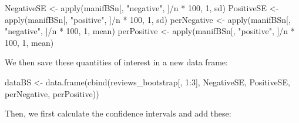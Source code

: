 \documentclass[
]{book}
\newenvironment{Shaded}{\begin{snugshade}}{\end{snugshade}}
\newcommand{\DecValTok}[1]{\textcolor[rgb]{0.00,0.00,0.81}{#1}}
\newcommand{\FloatTok}[1]{\textcolor[rgb]{0.00,0.00,0.81}{#1}}
\newcommand{\FunctionTok}[1]{\textcolor[rgb]{0.00,0.00,0.00}{#1}}
\newcommand{\NormalTok}[1]{#1}
\newcommand{\OtherTok}[1]{\textcolor[rgb]{0.56,0.35,0.01}{#1}}
\newcommand{\SpecialCharTok}[1]{\textcolor[rgb]{0.00,0.00,0.00}{#1}}
\newcommand{\StringTok}[1]{\textcolor[rgb]{0.31,0.60,0.02}{#1}}
\begin{document}
\begin{Shaded}
\begin{Highlighting}[]
\NormalTok{NegativeSE }\OtherTok{\textless{}{-}} \FunctionTok{apply}\NormalTok{(manifBSn[, }\StringTok{"negative"}\NormalTok{, ]}\SpecialCharTok{/}\NormalTok{n }\SpecialCharTok{*} \DecValTok{100}\NormalTok{, }\DecValTok{1}\NormalTok{, sd)}
\NormalTok{PositiveSE }\OtherTok{\textless{}{-}} \FunctionTok{apply}\NormalTok{(manifBSn[, }\StringTok{"positive"}\NormalTok{, ]}\SpecialCharTok{/}\NormalTok{n }\SpecialCharTok{*} \DecValTok{100}\NormalTok{, }\DecValTok{1}\NormalTok{, sd)}
\NormalTok{perNegative }\OtherTok{\textless{}{-}} \FunctionTok{apply}\NormalTok{(manifBSn[, }\StringTok{"negative"}\NormalTok{, ]}\SpecialCharTok{/}\NormalTok{n }\SpecialCharTok{*} \DecValTok{100}\NormalTok{, }\DecValTok{1}\NormalTok{, mean)}
\NormalTok{perPositive }\OtherTok{\textless{}{-}} \FunctionTok{apply}\NormalTok{(manifBSn[, }\StringTok{"positive"}\NormalTok{, ]}\SpecialCharTok{/}\NormalTok{n }\SpecialCharTok{*} \DecValTok{100}\NormalTok{, }\DecValTok{1}\NormalTok{, mean)}
\end{Highlighting}
\end{Shaded}

We then save these quantities of interest in a new data frame:

\begin{Shaded}
\begin{Highlighting}[]
\NormalTok{dataBS }\OtherTok{\textless{}{-}} \FunctionTok{data.frame}\NormalTok{(}\FunctionTok{cbind}\NormalTok{(reviews\_bootstrap[, }\DecValTok{1}\SpecialCharTok{:}\DecValTok{3}\NormalTok{], NegativeSE,}
\NormalTok{    PositiveSE, perNegative, perPositive))}
\end{Highlighting}
\end{Shaded}

Then, we first calculate the confidence intervals and add these:

\begin{Shaded}
\end{Shaded}
\end{document}
